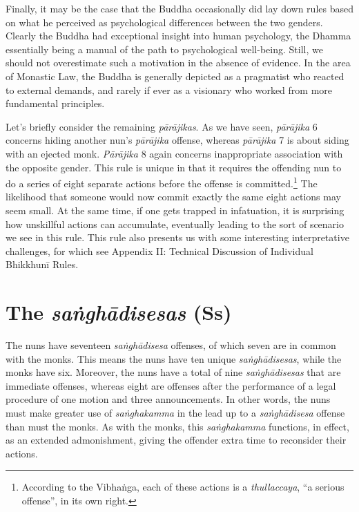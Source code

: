 \documentclass[12pt,openany]{book}%
\begin{document}
Finally, it may be the case that the Buddha occasionally did lay down rules based on what he perceived as psychological differences between the two genders. Clearly the Buddha had exceptional insight into human psychology, the Dhamma essentially being a manual of the path to psychological well-being. Still, we should not overestimate such a motivation in the absence of evidence. In the area of Monastic Law, the Buddha is generally depicted as a pragmatist who reacted to external demands, and rarely if ever as a visionary who worked from more fundamental principles.

Let’s briefly consider the remaining \textit{\textsanskrit{pārājikas}}. As we have seen, \textit{\textsanskrit{pārājika}} 6 concerns hiding another nun’s \textit{\textsanskrit{pārājika}} offense, whereas \textit{\textsanskrit{pārājika}} 7 is about siding with an ejected monk. \textit{\textsanskrit{Pārājika}} 8 again concerns inappropriate association with the opposite gender. This rule is unique in that it requires the offending nun to do a series of eight separate actions before the offense is committed.\footnote{According to the \textsanskrit{Vibhaṅga}, each of these actions is a \textit{thullaccaya}, “a serious offense”, in its own right. } The likelihood that someone would now commit exactly the same eight actions may seem small. At the same time, if one gets trapped in infatuation, it is surprising how unskillful actions can accumulate, eventually leading to the sort of scenario we see in this rule. This rule also presents us with some interesting interpretative challenges, for which see Appendix II: Technical Discussion of Individual \textsanskrit{Bhikkhunī} Rules.

\section*{The \textit{\textsanskrit{saṅghādisesas}} (Ss)}

The nuns have seventeen \textit{\textsanskrit{saṅghādisesa}} offenses, of which seven are in common with the monks. This means the nuns have ten unique \textit{\textsanskrit{saṅghādisesas}}, while the monks have six. Moreover, the nuns have a total of nine \textit{\textsanskrit{saṅghādisesas}} that are immediate offenses, whereas eight are offenses after the performance of a legal procedure of one motion and three announcements. In other words, the nuns must make greater use of \textit{\textsanskrit{saṅghakamma}} in the lead up to a \textit{\textsanskrit{saṅghādisesa}} offense than must the monks. As with the monks, this \textit{\textsanskrit{saṅghakamma}} functions, in effect, as an extended admonishment, giving the offender extra time to reconsider their actions.
\end{document}
